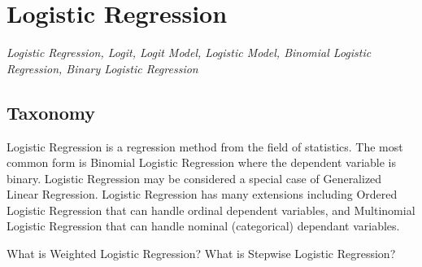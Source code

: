 
\section{Logistic Regression} 
\label{sec:logistic}

\emph{Logistic Regression, Logit, Logit Model, Logistic Model, Binomial Logistic Regression, Binary Logistic Regression}

\subsection{Taxonomy}
Logistic Regression is a regression method from the field of statistics. 
The most common form is Binomial Logistic Regression where the dependent variable is binary.
Logistic Regression may be considered a special case of Generalized Linear Regression.
Logistic Regression has many extensions including Ordered Logistic Regression that can handle ordinal dependent variables, and Multinomial Logistic Regression that can handle nominal (categorical) dependant variables.

What is Weighted Logistic Regression?
What is Stepwise Logistic Regression?

